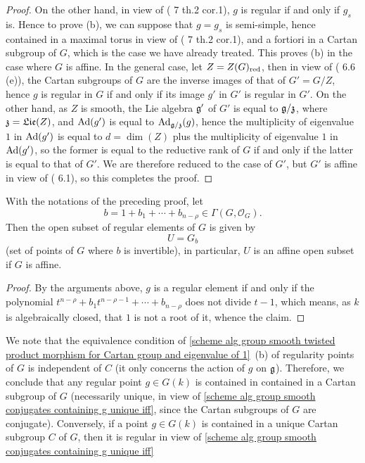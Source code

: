 \begin{proof}
On the other hand, in view of (\cite{Chevalley1958} 7 th.2 cor.1), $g$ is regular if and only if $g_s$ is. Hence to prove (b), we can suppose that $g=g_s$ is semi-simple, hence contained in a maximal torus in view of (\cite{Chevalley1958} 7 th.2 cor.1), and a fortiori in a Cartan subgroup of $G$, which is the case we have already treated. This proves (b) in the case where $G$ is affine. In the general case, let $Z=Z(G)_{\mathrm{red}}$, then in view of (\cite{SGA3-2}  6.6 (e)), the Cartan subgroups of $G$ are the inverse images of that of $G'=G/Z$, hence $g$ is regular in $G$ if and only if its image $g'$ in $G'$ is regular in $G'$. On the other hand, as $Z$ is smooth, the Lie algebra $\mathfrak{g}'$ of $G'$ is equal to $\mathfrak{g}/\mathfrak{z}$, where $\mathfrak{z}=\mathfrak{Lie}(Z)$, and $\mathrm{Ad}(g')$ is equal to $\mathrm{Ad}_{\mathfrak{g}/\mathfrak{z}}(g)$, hence the multiplicity of eigenvalue $1$ in $\mathrm{Ad}(g')$ is equal to $d=\dim(Z)$ plus the multiplicity of eigenvalue $1$ in $\mathrm{Ad}(g')$, so the former is equal to the reductive rank of $G$ if and only if the latter is equal to that of $G'$. We are therefore reduced to the case of $G'$, but $G'$ is affine in view of (\cite{SGA3-2}  6.1), so this completes the proof.
\end{proof}

\begin{corollary}\label{scheme alg group smooth open of regular element given by G_b}
With the notations of the preceding proof, let
\[b=1+b_1+\cdots+b_{n-\rho}\in\Gamma(G,\mathscr{O}_G).\]
Then the open subset of regular elements of $G$ is given by
\[U=G_b\]
(set of points of $G$ where $b$ is invertible), in particular, $U$ is an affine open subset if $G$ is affine.
\end{corollary}
\begin{proof}
By the arguments above, $g$ is a regular element if and only if the polynomial $t^{n-\rho}+b_1t^{n-\rho-1}+\cdots+b_{n-\rho}$ does not divide $t-1$, which means, as $k$ is algebraically closed, that $1$ is not a root of it, whence the claim.
\end{proof}

\begin{remark}\label{scheme alg group regular element contained in unique Cartan subgroup}
We note that the equivalence condition of \cref{scheme alg group smooth twisted product morphism for Cartan group and eigenvalue of 1}~(b) of regularity points of $G$ is independent of $C$ (it only concerns the action of $g$ on $\mathfrak{g}$). Therefore, we conclude that any regular point $g\in G(k)$ is contained in contained in a Cartan subgroup of $G$ (necessarily unique, in view of \cref{scheme alg group smooth conjugates containing g unique iff}, since the Cartan subgroups of $G$ are conjugate). Conversely, if a point $g\in G(k)$ is contained in a unique Cartan subgroup $C$ of $G$, then it is regular in view of \cref{scheme alg group smooth conjugates containing g unique iff}
\end{remark}


